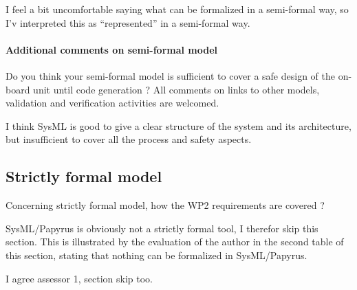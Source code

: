 \begin{assessor1}
I feel a bit uncomfortable saying what can be formalized in a semi-formal way, so I'v interpreted this as "`represented"' in a semi-formal way. 
\end{assessor1}

\paragraph{Additional comments on semi-formal model} Do you think your semi-formal model is sufficient to cover a safe design of the on-board unit until code generation ?
All comments on links to other models, validation and verification activities are welcomed.


\begin{assessor2}
I think SysML is good to give a clear structure of the system and its architecture, but insufficient to cover all the process and safety aspects.
\end{assessor2}

\subsection{Strictly formal model}

Concerning strictly formal model, how the WP2 requirements are covered ?

\begin{assessor1}
SysML/Papyrus is obviously not a strictly formal tool, I therefor skip this section. 
This is illustrated by the evaluation of the author in the second table of this section, stating that nothing can be formalized in SysML/Papyrus. 
\end{assessor1}


\begin{assessor2}
I agree assessor 1, section skip too.
\end{assessor2}

